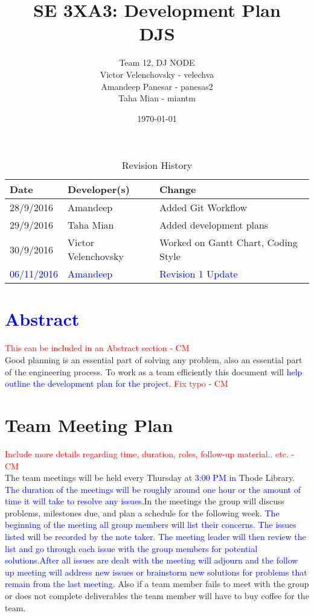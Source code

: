 \documentclass{article}
\title{SE 3XA3: Development Plan\\DJS}
\author{Team 12, DJ NODE
		\\ Victor Velenchovsky - velechva
		\\ Amandeep Panesar - panesas2
		\\ Taha Mian - miantm
}
\date{\today}
\begin{document}
\begin{table}[hp]
\caption{Revision History} \label{TblRevisionHistory}
\begin{tabularx}{\textwidth}{llX}
\toprule
\textbf{Date} & \textbf{Developer(s)} & \textbf{Change}\\
\midrule
28/9/2016 & Amandeep & Added Git Workflow\\
29/9/2016 & Taha Mian & Added development plans\\
30/9/2016 & Victor Velenchovsky  & Worked on Gantt Chart, Coding Style\\
\textcolor{blue}{06/11/2016} & \textcolor{blue}{Amandeep} & \textcolor{blue}{Revision 1 Update}\\
\bottomrule
\end{tabularx}
\end{table}

\newpage

\maketitle
\section{\textcolor{blue}{Abstract}}
\textcolor{red}{ This can be included in an Abstract section - CM} \\
Good planning is an essential part of solving any problem, also an essential part of the engineering process. To work as a team efficiently this document will \textcolor{blue}{help outline the development plan for the project}.\textcolor{red}{ Fix typo - CM}

\section{Team Meeting Plan}
\textcolor{red}{Include more details regarding time, duration, roles, follow-up material.. etc. - CM} \\
The team meetings will be held every Thursday at \textcolor{blue}{3:00 PM in} Thode Library. \textcolor{blue}{The duration of the meetings will be roughly around one hour or the amount of time it will take to resolve any issues.}In the meetings the group will discuss problems, milestones due, and plan a schedule for the following week. \textcolor{blue}{The beginning of the meeting all group members will list their concerns. The issues listed will be recorded by the note taker. The meeting leader will then review the list and go through each issue with the group members for potential solutions.After all issues are dealt with the meeting will adjourn and the follow up meeting will address new issues or brainstorm new solutions for problems that remain from the last meeting.} Also if a team member fails to meet with the group or does not complete deliverables the team member will have to buy coffee for the team.
\end{document}
